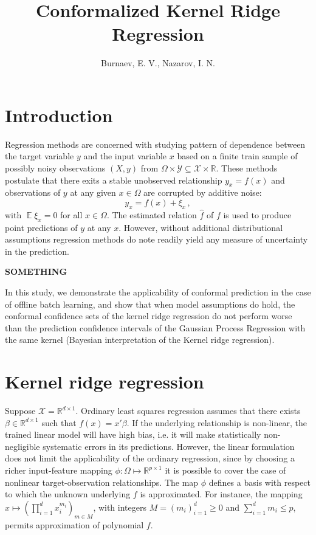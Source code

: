 \documentclass{ITaSconf}
\title{Conformalized Kernel Ridge Regression}
\author{Burnaev, E. V., Nazarov, I. N.}
\newcommand{\ex}{\mathop{\mathbb{E}}\nolimits}
\newcommand{\Xcal}{\mathcal{X}}
\newcommand{\Ycal}{\mathcal{Y}}
\newcommand{\Real}{\mathbb{R}}
\begin{document}
\maketitle


\section{Introduction} %
\label{sec:introduction}

Regression methods are concerned with studying pattern of dependence between the
target variable $y$ and the input variable $x$ based on a finite train sample of 
possibly noisy observations $(X, y)$ from $\Omega\times \Ycal \subseteq \Xcal\times\Real$.
These methods postulate that there exits a stable unobserved relationship $y_x = f(x)$
and observations of $y$ at any given $x\in\Omega$ are corrupted by additive noise:
\begin{equation} \label{eq:signal_model}
  y_x = f(x) + \xi_x \,,
\end{equation}
with $\ex \xi_x = 0$ for all $x\in \Omega$. The estimated relation $\hat{f}$ of $f$
is used to produce point predictions of $y$ at any $x$. However, without additional
distributional assumptions regression methods do note readily yield any measure of
uncertainty in the prediction.

\noindent \textbf{SOMETHING}

In this study, we demonstrate the applicability of conformal prediction in the case
of offline batch learning, and show that when model assumptions do hold, the conformal
confidence sets of the kernel ridge regression do not perform worse than the prediction
confidence intervals of the Gaussian Process Regression with the same kernel (Bayesian
interpretation of the Kernel ridge regression).


\section{Kernel ridge regression} %
\label{sec:kernel_ridge_regression}

Suppose $\Xcal = \Real^{d\times 1}$. Ordinary least squares regression assumes that
there exists $\beta\in \Real^{d\times 1}$ such that $f(x) = x'\beta$. If the underlying
relationship is non-linear, the trained linear model will have high bias, i.e.
it will make statistically non-negligible systematic errors in its predictions.
However, the linear formulation does not limit the applicability of the ordinary
regression, since by choosing a richer input-feature mapping $\phi: \Omega \mapsto
\Real^{p\times 1}$ it is possible to cover the case of nonlinear target-observation
relationships. The map $\phi$ defines a basis with respect to which the unknown
underlying $f$ is approximated. For instance, the mapping $x\mapsto (\prod_{i=1}^d
x_i^{m_i})_{m\in M}$, with integers $M=(m_i)_{i=1}^d\geq 0$ and $\sum_{i=1}^d m_i \leq p$,
permits approximation of polynomial $f$.
\end{document}
